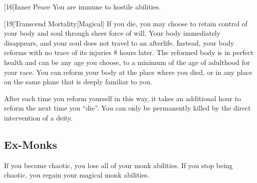         [16]{Inner Peace}
        You are immune to hostile  abilities.

        [19]{Transcend Mortality}[Magical]
        If you die, you may choose to retain control of your body and soul through sheer force of will.
        Your body immediately disappears, and your soul does not travel to an afterlife.
        Instead, your body reforms with no trace of its injuries 8 hours later.
        The reformed body is in perfect health and can be any age you choose, to a minimum of the age of adulthood for your race.
        You can reform your body at the place where you died, or in any place on the same plane that is deeply familiar to you.

        After each time you reform yourself in this way, it takes an additional hour to reform the next time you ``die''.
        You can only be permanently killed by the direct intervention of a deity.

    \subsection{Ex-Monks}
        If you become chaotic, you lose all of your  monk abilities.
        If you stop being chaotic, you regain your magical monk abilities.

